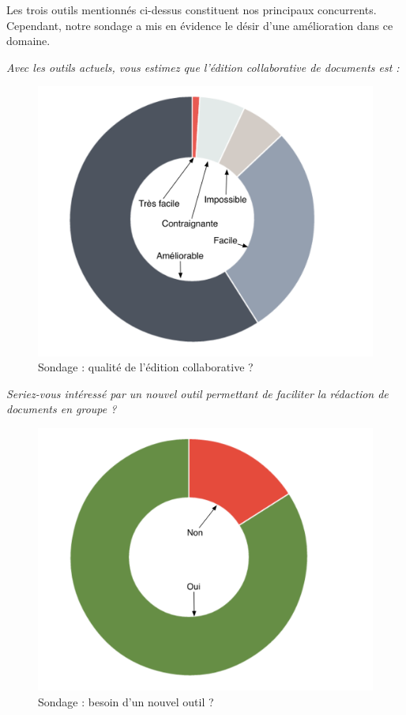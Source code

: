 \documentclass[10pt,twocolumn,a4paper,utf8x]{article}
\begin{document}
Les trois outils mentionnés ci-dessus constituent nos principaux
concurrents. Cependant, notre sondage a mis en évidence le désir d'une
amélioration dans ce domaine.

\emph{Avec les outils actuels, vous estimez que l'édition collaborative
de documents est :}

\begin{figure}[htbp]
\centering
\includegraphics[width=\hsize]{sondageOpigionsOutilsActuels.png}
\caption{Sondage : qualité de l'édition collaborative ?}
\end{figure}

\emph{Seriez-vous intéressé par un nouvel outil permettant de faciliter
la rédaction de documents en groupe ?}

\begin{figure}[htbp]
\centering
\includegraphics[width=\hsize]{sondageBesoins.png}
\caption{Sondage : besoin d'un nouvel outil ?}
\end{figure}
\end{document}
